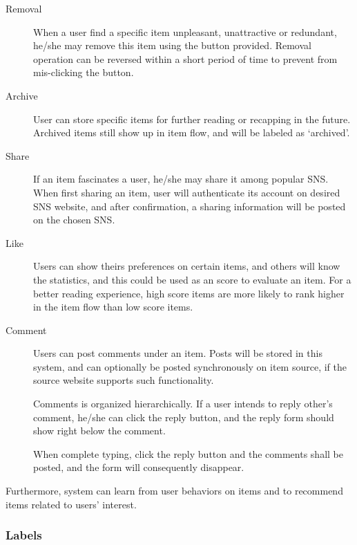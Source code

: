 \begin{description}
\item[Removal] \hfill

  When a user find a specific item unpleasant, unattractive or redundant, he/she
  may remove this item using the button provided. Removal operation can be
  reversed within a short period of time to prevent from mis-clicking the button.

\item[Archive] \hfill

  User can store specific items for further reading or recapping in
  the future. Archived items still show up in item flow, and will be
  labeled as `archived'.

\item[Share] \hfill

  If an item fascinates a user, he/she may share it among popular SNS.
  When first sharing an item, user will authenticate its account on
  desired SNS website, and after confirmation, a sharing information
  will be posted on the chosen SNS.

\item[Like] \hfill

  Users can show theirs preferences on certain items, and others will
  know the statistics, and this could be used as an score to evaluate an
  item. For a better reading experience, high score items are more likely to rank higher in the item flow than low score items.

\item[Comment] \hfill

  Users can post comments under an item. Posts will be stored in
  this system, and can optionally be posted synchronously on item
  source, if the source website supports such functionality.

  Comments is organized hierarchically. If a user intends to reply
  other's comment, he/she can click the reply button, and the
  reply form should show right below the comment.

  When complete typing, click the reply button and the comments shall be
  posted, and the form will consequently disappear.
\end{description}

Furthermore, system can learn from user behaviors on items and to
recommend items related to users' interest.

\subsubsection{Labels}

